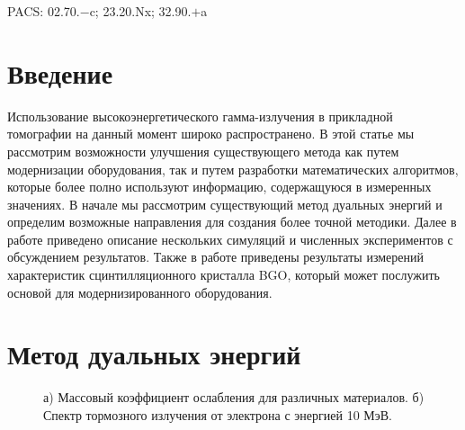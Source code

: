 \documentclass[a4paper]{panl}
\begin{document}
\noindent
PACS: 02.70.$-$c; 23.20.Nx; 32.90.$+$a

\newpage
\label{sec:intro}
\section*{Введение}
Использование высокоэнергетического гамма-излучения в прикладной томографии на данный момент широко распространено.  В этой статье мы рассмотрим возможности улучшения существующего метода как путем модернизации оборудования, так и путем разработки математических алгоритмов, которые более полно используют информацию, содержащуюся в измеренных значениях. В начале мы рассмотрим существующий метод дуальных энергий и определим возможные направления для создания более точной методики. Далее в работе приведено описание нескольких симуляций и численных экспериментов с обсуждением результатов. Также в работе приведены результаты измерений характеристик сцинтилляционного кристалла BGO, который может послужить основой для модернизированного оборудования. 
\section*{Метод дуальных энергий}
\begin{figure}[t]
    \begin{center}
        \begin{minipage}[h]{0.49\linewidth}
        \end{minipage}
        \hfill
        \begin{minipage}[h]{0.49\linewidth}
        \end{minipage}
        \vspace{-3mm}
        \caption{а) Массовый коэффициент ослабления для различных материалов. б) Спектр тормозного излучения от электрона с энергией 10 МэВ.}
    \end{center}
    \vspace{-5mm}
\end{figure}
\end{document}
